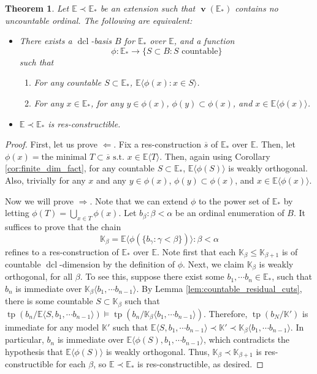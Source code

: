 \documentclass{amsart}
\newtheorem{theorem}{Theorem}
\theoremstyle{remark}
\theoremstyle{definition}
\theoremstyle{plain}
\newcommand{\bE}{\mathbb E}
\newcommand{\bK}{\mathbb K}
\DeclareMathOperator{\val}{\mathbf{v}}
\DeclareMathOperator{\tp}{\mathrm{tp}}
\DeclareMathOperator{\dcl}{\mathrm{dcl}}
\theoremstyle{plain}
\begin{document}
\begin{theorem}\label{thm:uniform_condition}
Let $\bE \prec \bE_*$ be an extension such that $\val(\bE_*)$ contains no uncountable ordinal. The following are equivalent:
\begin{itemize}
    \item  There exists a $\dcl$-basis $B$ for $\bE_*$ over $\bE$, and a function
\[
\phi : \bE_* \rightarrow \{ S \subset B : S\text{ countable} \}
\]
such that
\begin{enumerate}
\item For any countable $S \subset \bE_*$, $\bE\langle \phi(x) : x \in S \rangle$.
\item For any $x \in \bE_*$, for any $y \in \phi(x)$,
$\phi(y) \subset \phi(x)$, and $x \in \bE \langle \phi(x) \rangle$.
\end{enumerate}

\item $\bE \prec \bE_*$ is res-constructible.
\end{itemize}
\end{theorem}
\begin{proof}
First, let us prove $\Leftarrow$. Fix a res-construction $\overline{s}$ of $\bE_*$ over $\bE$. Then, let $\phi(x) = \text{the minimal } T \subset \overline{s} \text{ s.t. } x \in \bE\langle T \rangle$. Then, again using Corollary \ref{cor:finite_dim_fact}, for any countable $S \subset \bE_*$, $\bE\langle \phi(S)\rangle$ is weakly orthogonal.
Also, trivially for any $x$ and any $y \in \phi(x)$, $\phi(y) \subset \phi(x)$, and $x \in \bE\langle \phi(x)\rangle$.

Now we will prove $\Rightarrow$. Note that we can extend $\phi$ to the power set of $\bE_*$ by letting $\phi(T) = \bigcup_{x\in T} \phi(x)$. Let $b_\beta : \beta < \alpha$ be an ordinal enumeration of $B$. It suffices to prove that the chain
\[
\bK_\beta = \bE \langle \phi(\{ b_\gamma : \gamma < \beta\}) \rangle : \beta < \alpha
\]
refines to a res-construction of $\bE_*$ over $\bE$.
Note first that each $\bK_\beta \leq \bK_{\beta+1}$ is of countable $\dcl$-dimension by the definition of $\phi$.
Next, we claim $\bK_\beta$ is weakly orthogonal, for all $\beta$.
To see this, suppose there exist some $b_1,\cdots b_n \in \bE_*$, such that $b_n$ is immediate over $\bK_\beta \langle b_1,\cdots b_{n-1} \rangle$.
By Lemma \ref{lem:countable_residual_cuts}, there is some countable $S \subset \bK_\beta$ such that $\tp(b_{n}/\bE\langle S,b_1,\cdots b_{n-1}\rangle) \models \tp(b_{n}/\bK_\beta\langle b_1,\cdots b_{n-1}\rangle)$. 
Therefore, $\tp(b_N/\bK')$ is immediate for any model $\bK'$ such that $\bE\langle S,b_1,\cdots b_{n-1}\rangle \prec \bK' \prec \bK_\beta\langle b_1,\cdots b_{n-1}\rangle$.
In particular, $b_{n}$ is immediate over $\bE \langle \phi(S), b_1, \cdots b_{n-1} \rangle$, which contradicts the hypothesis that $\bE \langle \phi(S) \rangle$ is weakly orthogonal.
Thus, $\bK_\beta \prec \bK_{\beta+1}$ is res-constructible for each $\beta$, so $\bE \prec \bE_*$ is res-constructible, as desired.
\end{proof}
\end{document}
